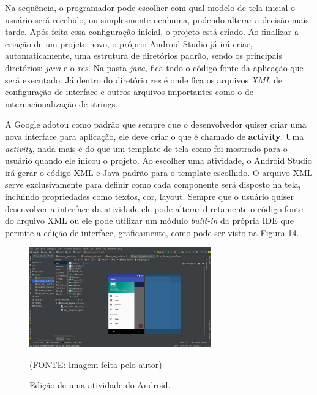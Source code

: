 \documentclass[
    12pt,       %
    openright,      %
    twoside,      %
    a4paper,      %
    english,      %
    french,       %
    spanish,      %
    brazil,       %
    ]{abntex2}
\begin{document}
        Na sequência, o programador pode escolher com qual modelo de tela inicial o usuário será
        recebido, ou simplesmente nenhuma, podendo alterar a decisão mais tarde. Após feita essa
        configuração inicial, o projeto está criado. Ao finalizar a criação de um projeto novo,
        o próprio Android Studio já irá criar, automaticamente, uma estrutura de diretórios padrão,
        sendo os principais diretórios: \textit{java} e o \textit{res}. Na pasta \textit{java},
        fica todo o código fonte da aplicação que será executado. Já dentro do diretório
        \textit{res} é onde fica os arquivos \textit{XML} de configuração de interface e outros
        arquivos importantes como o de internacionalização de strings.

        A Google adotou como padrão que sempre que o desenvolvedor quiser criar uma nova interface
        para aplicação, ele deve criar o que é chamado de \textbf{activity}. Uma \textit{activity},
        nada mais é do que um template de tela como foi mostrado para o usuário quando ele inicou o
        projeto. Ao escolher uma atividade, o Android Studio irá gerar o código XML e Java padrão
        para o template escolhido. O arquivo XML serve exclusivamente para definir como cada
        componente será disposto na tela, incluindo propriedades como textos, cor, layout. Sempre
        que o usuário quiser desenvolver a interface da atividade ele pode alterar diretamente
        o código fonte do arquivo XML ou ele pode utilizar um módulo \textit{built-in} da própria
        IDE que permite a edição de interface, graficamente, como pode ser visto na Figura 14.

        \begin{figure}[htbp]
            \begin{center}
                \includegraphics[width=0.7\textwidth]{img/interfaceEditing.png}
            \end{center}
        \caption{\label{fig:passaro}Edição de uma atividade do Android.}
        \begin{center}(FONTE: Imagem feita pelo autor)\end{center}
        \end{figure}
\end{document}
